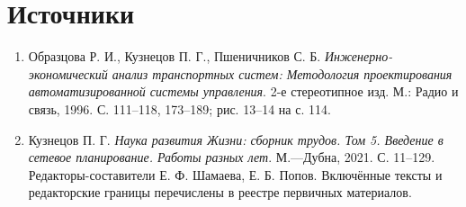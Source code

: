 \documentclass[12pt,a4paper]{article}
\begin{document}
\section*{Источники}
\begin{enumerate}
\item Образцова Р. И., Кузнецов П. Г., Пшеничников С. Б. \textit{Инженерно-экономический анализ транспортных систем: Методология проектирования автоматизированной системы управления}. 2-е стереотипное изд. М.: Радио и связь, 1996. С. 111--118, 173--189; рис. 13--14 на с. 114.
\item Кузнецов П. Г. \textit{Наука развития Жизни: сборник трудов. Том 5. Введение в сетевое планирование. Работы разных лет}. М.—Дубна, 2021. С. 11--129. Редакторы-составители Е. Ф. Шамаева, Е. Б. Попов. Включённые тексты и редакторские границы перечислены в реестре первичных материалов.
\end{enumerate}
\end{document}
